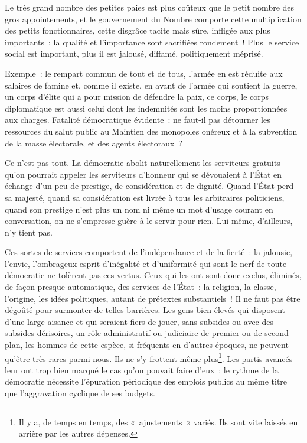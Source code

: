 \documentclass[french,twoside]{book} %
\begin{document}
\noindent Le très grand nombre des petites paies est plus coûteux que le petit nombre des gros appointements, et le gouvernement du Nombre comporte cette multiplication des petits fonctionnaires, cette disgrâce tacite mais sûre, infligée aux plus importants : la qualité et l’importance sont sacrifiées rondement ! Plus le service social est important, plus il est jalousé, diffamé, politiquement méprisé.\par
Exemple : le rempart commun de tout et de tous, l’armée en est réduite aux salaires de famine et, comme il existe, en avant de l’armée qui soutient la guerre, un corps d’élite qui a pour mission de défendre la paix, ce corps, le corps diplomatique est aussi celui dont les indemnités sont les moins proportionnées aux charges. Fatalité démocratique évidente : ne faut-il pas détourner les ressources du salut public au Maintien des monopoles onéreux et à la subvention de la masse électorale, et des agents électoraux ?\par
Ce n’est pas tout. La démocratie abolit naturellement les serviteurs gratuits qu’on pourrait appeler les serviteurs d’honneur qui se dévouaient à l’État en échange d’un peu de prestige, de considération et de dignité. Quand l’État perd sa majesté, quand sa considération est livrée à tous les arbitraires politiciens, quand son prestige n’est plus un nom ni même un mot d’usage courant en conversation, on ne s’empresse guère à le servir pour rien. Lui-même, d’ailleurs, n’y tient pas.\par
Ces sortes de services comportent de l’indépendance et de la fierté : la jalousie, l’envie, l’ombrageux esprit d’inégalité et d’uniformité qui sont le nerf de toute démocratie ne tolèrent pas ces vertus. Ceux qui les ont sont donc exclus, éliminés, de façon presque automatique, des services de l’État : la religion, la classe, l’origine, les idées politiques, autant de prétextes substantiels ! Il ne faut pas être dégoûté pour surmonter de telles barrières. Les gens bien élevés qui disposent d’une large aisance et qui seraient fiers de jouer, sans subsides ou avec des subsides dérisoires, un rôle administratif ou judiciaire de premier ou de second plan, les hommes de cette espèce, si fréquents en d’autres époques, ne peuvent qu’être très rares parmi nous. Ils ne s’y frottent même plus\footnote{Il y a, de temps en temps, des « ajustements » variés. Ils sont vite laissés en arrière par les autres dépenses.}. Les partis avancés leur ont trop bien marqué le cas qu’on pouvait faire d’eux : le rythme de la démocratie nécessite l’épuration périodique des emplois publics au même titre que l’aggravation cyclique de ses budgets.\par
\end{document}
